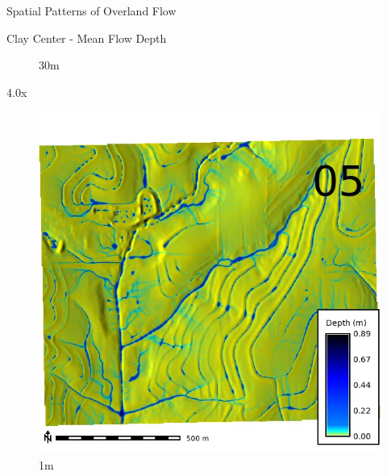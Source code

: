 \documentclass[
  ignorenonframetext,
]{beamer}
\begin{document}
\begin{frame}{Spatial Patterns of Overland Flow}
\begin{block}{Clay Center - Mean Flow Depth}
\begin{figure}[H]
{}

\caption{30m}

\end{figure}%

4.0x

\begin{figure}[H]

{\centering \includegraphics{../output/clay-center/sensitivity_1/clay-center_depth_1_4_s_average.webp}

}

\caption{1m}

\end{figure}%

\begin{figure}[H]


\end{figure}
\end{block}
\end{frame}
\end{document}
